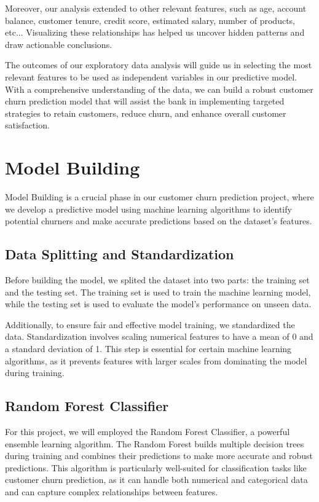 \documentclass[11pt,a4paper]{article}
\begin{document}
Moreover, our analysis extended to other relevant features, such as age, account balance, customer tenure, credit score, estimated salary, number of products, etc... Visualizing these relationships has helped us uncover hidden patterns and draw actionable conclusions.

The outcomes of our exploratory data analysis will guide us in selecting the most relevant features to be used as independent variables in our predictive model. With a comprehensive understanding of the data, we can build a robust customer churn prediction model that will assist the bank in implementing targeted strategies to retain customers, reduce churn, and enhance overall customer satisfaction.

\section{Model Building}

Model Building is a crucial phase in our customer churn prediction project, where we develop a predictive model using machine learning algorithms to identify potential churners and make accurate predictions based on the dataset's features.

\subsection{Data Splitting and Standardization}

Before building the model, we splited the dataset into two parts: the training set and the testing set. The training set is used to train the machine learning model, while the testing set is used to evaluate the model's performance on unseen data.

Additionally, to ensure fair and effective model training, we standardized the data. Standardization involves scaling numerical features to have a mean of 0 and a standard deviation of 1. This step is essential for certain machine learning algorithms, as it prevents features with larger scales from dominating the model during training.

\subsection{Random Forest Classifier}

For this project, we will employed the Random Forest Classifier, a powerful ensemble learning algorithm. The Random Forest builds multiple decision trees during training and combines their predictions to make more accurate and robust predictions. This algorithm is particularly well-suited for classification tasks like customer churn prediction, as it can handle both numerical and categorical data and can capture complex relationships between features.
\end{document}
